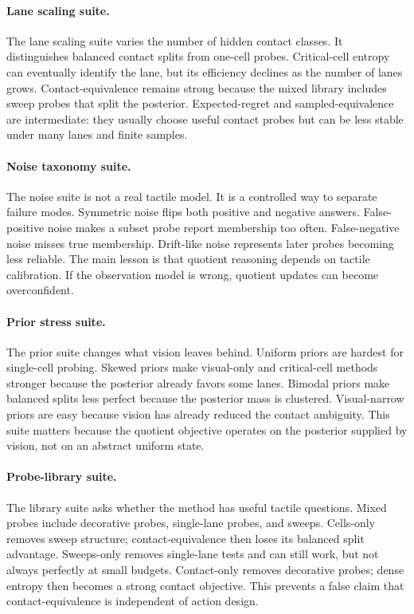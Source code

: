 \documentclass{article}
\begin{document}
\paragraph{Lane scaling suite.}
The lane scaling suite varies the number of hidden contact classes. It distinguishes balanced contact splits from one-cell probes. Critical-cell entropy can eventually identify the lane, but its efficiency declines as the number of lanes grows. Contact-equivalence remains strong because the mixed library includes sweep probes that split the posterior. Expected-regret and sampled-equivalence are intermediate: they usually choose useful contact probes but can be less stable under many lanes and finite samples.

\paragraph{Noise taxonomy suite.}
The noise suite is not a real tactile model. It is a controlled way to separate failure modes. Symmetric noise flips both positive and negative answers. False-positive noise makes a subset probe report membership too often. False-negative noise misses true membership. Drift-like noise represents later probes becoming less reliable. The main lesson is that quotient reasoning depends on tactile calibration. If the observation model is wrong, quotient updates can become overconfident.

\paragraph{Prior stress suite.}
The prior suite changes what vision leaves behind. Uniform priors are hardest for single-cell probing. Skewed priors make visual-only and critical-cell methods stronger because the posterior already favors some lanes. Bimodal priors make balanced splits less perfect because the posterior mass is clustered. Visual-narrow priors are easy because vision has already reduced the contact ambiguity. This suite matters because the quotient objective operates on the posterior supplied by vision, not on an abstract uniform state.

\paragraph{Probe-library suite.}
The library suite asks whether the method has useful tactile questions. Mixed probes include decorative probes, single-lane probes, and sweeps. Cells-only removes sweep structure; contact-equivalence then loses its balanced split advantage. Sweeps-only removes single-lane tests and can still work, but not always perfectly at small budgets. Contact-only removes decorative probes; dense entropy then becomes a strong contact objective. This prevents a false claim that contact-equivalence is independent of action design.
\end{document}
